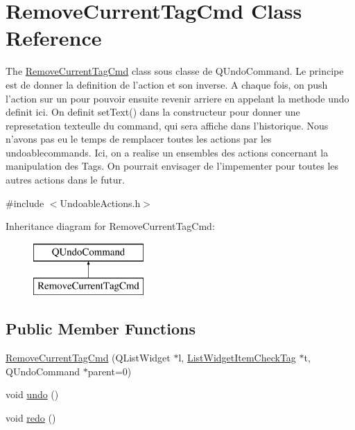 \hypertarget{class_remove_current_tag_cmd}{\section{Remove\-Current\-Tag\-Cmd Class Reference}
\label{class_remove_current_tag_cmd}
}


The \hyperlink{class_remove_current_tag_cmd}{Remove\-Current\-Tag\-Cmd} class sous classe de Q\-Undo\-Command. Le principe est de donner la definition de l'action et son inverse. A chaque fois, on push l'action sur un  pour pouvoir ensuite revenir arriere en appelant la methode undo definit ici. On definit set\-Text() dans la constructeur pour donner une represetation texteulle du command, qui sera affiche dans l'historique. Nous n'avons pas eu le temps de remplacer toutes les actions par les undoablecommands. Ici, on a realise un ensembles des actions concernant la manipulation des Tags. On pourrait envisager de l'impementer pour toutes les autres actions dans le futur.  




{\ttfamily \#include $<$Undoable\-Actions.\-h$>$}

Inheritance diagram for Remove\-Current\-Tag\-Cmd\-:\begin{figure}[H]
\begin{center}
\leavevmode
\includegraphics[height=2.000000cm]{class_remove_current_tag_cmd}
\end{center}
\end{figure}
\subsection*{Public Member Functions}
\begin{DoxyCompactItemize}
\item 
\hyperlink{class_remove_current_tag_cmd_ae1e7b29d12addad8ded72aa3cba75053}{Remove\-Current\-Tag\-Cmd} (Q\-List\-Widget $\ast$l, \hyperlink{class_list_widget_item_check_tag}{List\-Widget\-Item\-Check\-Tag} $\ast$t, Q\-Undo\-Command $\ast$parent=0)
\item 
void \hyperlink{class_remove_current_tag_cmd_a304d41b9fb69346c2e30142ba7336793}{undo} ()
\item 
void \hyperlink{class_remove_current_tag_cmd_aa02e377e7940cf4a620bb5d11a64ac72}{redo} ()
\end{DoxyCompactItemize}


